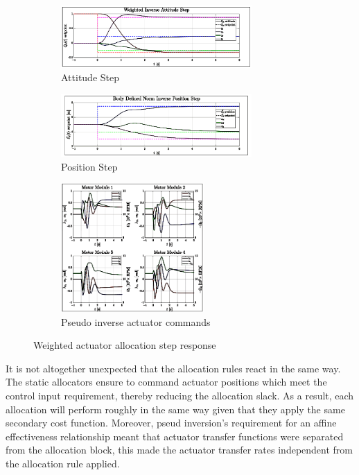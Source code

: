 \begin{figure}[hbtp]
\centering
\begin{subfigure}{\textwidth}
\centering
\includegraphics[width=0.8\textwidth]{graphs/weighted_inverse_attitude}
\vspace{-12pt}
\caption{Attitude Step}
\label{fig:weighted_inverse_attitude}
\end{subfigure}
\begin{subfigure}{\textwidth}
\centering
\includegraphics[width=0.8\textwidth]{graphs/body_norm_position}
\vspace{-2pt}
\caption{Position Step}
\label{fig:weighted_inverse_position}
\end{subfigure}
\vspace{-8pt}
\begin{subfigure}{\textwidth}
\centering
\includegraphics[width=0.6\textwidth]{graphs/body_norm_input}
\caption{Pseudo inverse actuator commands}
\label{fig:weighted_inverse_input}
\end{subfigure}
\caption{Weighted actuator allocation step response}
\label{fig:weighted-inverse-step}
\vspace{-16pt}
\end{figure}
\par
It is not altogether unexpected that the allocation rules react in the same way. The static allocators ensure to command actuator positions which meet the control input requirement, thereby reducing the allocation slack. As a result, each allocation will perform roughly in the same way given that they apply the same secondary cost function. Moreover, pseud inversion's requirement for an affine effectiveness relationship meant that actuator transfer functions were separated from the allocation block, this made the actuator transfer rates independent from the allocation rule applied.
